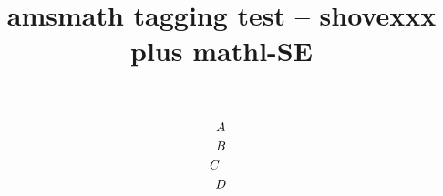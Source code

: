 \documentclass{article}
\title{amsmath tagging test -- shovexxx plus mathl-SE}
\begin{document}
\begin{multline}
A\\
B\\
\shoveright{C}\\
D
\end{multline}
\end{document}
